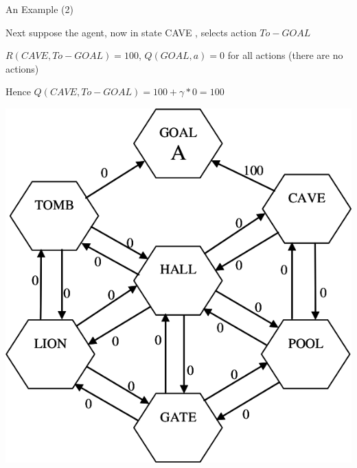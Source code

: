 \documentclass[]{beamer}
\begin{document}
\begin{frame}{An Example (2)}

Next suppose the agent, now in state CAVE , selects action \(To-GOAL\)

\(R(CAVE, To-GOAL) = 100\), \({Q}(GOAL,a) = 0\) for all actions (there
are no actions)

Hence \({Q}(CAVE, To-GOAL) = 100 + \gamma * 0 = 100\)

\center
\includegraphics[scale=0.20]{figures/example2.png}

\end{frame}
\end{document}
